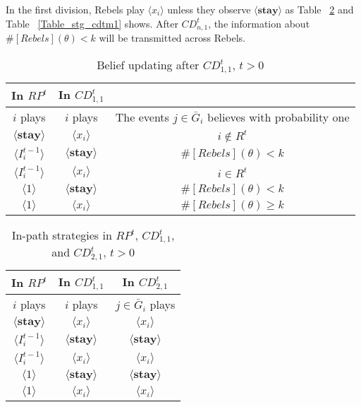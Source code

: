 \documentclass[12pt,letterpaper]{article}
\theoremstyle{definition}
\theoremstyle{remark}
\theoremstyle{claim}
\begin{document}
In the first division, Rebels play $\langle x_i \rangle$ unless they observe $\langle \textbf{stay} \rangle$ as Table ~\ref{Table_stg_cdt21} and Table ~\ref{Table_stg_cdtm1} shows. After $CD^t_{n,1}$, the information about $\#[Rebels](\theta)< k$ will be transmitted across Rebels. 
\begin{table}[ht]
\caption{Belief updating after $CD^t_{1,1}$, $t>0$}
\label{Table_blf_up_cdt11}
\begin{center}
\begin{tabular}{c c c}
In $RP^t$ 	&  	In $CD^t_{1,1}$		&  \\
\hline
\hline
$i$ plays 		&  	$i$ plays		& The events $j\in \bar{G}_i$ believes with probability one  \\
\hline
$\langle  \textbf{stay} \rangle$ 	& 	$\langle x_i \rangle$	    & $i\notin R^t$ \\
$\langle  {I^{t-1}_i} \rangle$ 		&  $\langle \textbf{stay} \rangle$		& $\#[Rebels](\theta)< k$     \\
$\langle  {I^{t-1}_i} \rangle$ 		&  $\langle x_i \rangle$		& $i\in R^t$     \\
$\langle 1 \rangle$ 		             &  $\langle \textbf{stay} \rangle$		& $\#[Rebels](\theta)< k$  \\
$\langle 1 \rangle$ 		             &  $\langle x_i \rangle$		&  $\#[Rebels](\theta)\geq k$ 
\end{tabular}
\end{center}
\end{table}



\begin{table}[ht]
\caption{In-path strategies in $RP^t$, $CD^t_{1,1}$, and $CD^t_{2,1}$, $t>0$}
\label{Table_stg_cdt21}
\begin{center}
\begin{tabular}{c c c}
In $RP^t$ 	 	&  	In $CD^t_{1,1}$		&  In $CD^t_{2,1}$	\\
\hline
\hline
$i$ plays 		  							&  	$i$ plays									& $j\in \bar{G}_{i}$ plays  \\
\hline
$\langle  \textbf{stay} \rangle$ 	& 	$\langle x_i \rangle$	    & $\langle x_i \rangle$ \\
$\langle  {I^{t-1}_i} \rangle$ 		&  $\langle \textbf{stay} \rangle$		& $\langle \textbf{stay} \rangle$     \\
$\langle  {I^{t-1}_i} \rangle$ 		&  $\langle x_i \rangle$		& $\langle x_i \rangle$     \\
$\langle 1 \rangle$ 		             &  $\langle \textbf{stay} \rangle$		& $\langle \textbf{stay} \rangle$  \\
$\langle 1 \rangle$ 		             &  $\langle x_i \rangle$		&  $\langle x_i \rangle$  
\end{tabular}
\end{center}
\end{table}
\end{document}
